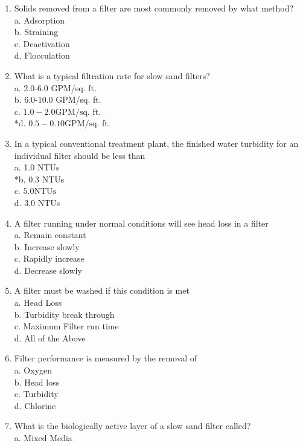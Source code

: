 \begin{enumerate}
\item Solids removed from a filter are most commonly removed by what method?\\
a. Adsorption\\
b. Straining\\
c. Deactivation\\
d. Flocculation\\
\item What is a typical filtration rate for slow sand filters?\\
a. 2.0-6.0 GPM/sq. ft.\\
b. 6.0-10.0 GPM/sq. ft.\\
c. $1.0-2.0 \mathrm{GPM} / \mathrm{sq}$. ft.\\
*d. $0.5-0.10 \mathrm{GPM} / \mathrm{sq}$. ft.\\
\item In a typical conventional treatment plant, the finished water turbidity for an individual filter should be less than\\
a. 1.0 NTUs\\
*b. 0.3 NTUs\\
c. $5.0 \mathrm{NTUs}$\\
d. 3.0 NTUs\\
\item A filter running under normal conditions will see head loss in a filter\\
a. Remain constant\\
b. Increase slowly\\
c. Rapidly increase\\
d. Decrease slowly\\
\item A filter must be washed if this condition is met\\
a. Head Loss\\
b. Turbidity break through\\
c. Maximum Filter run time\\
d. All of the Above\\
\item Filter performance is measured by the removal of\\
a. Oxygen\\
b. Head loss\\
c. Turbidity\\
d. Chlorine\\
\item What is the biologically active layer of a slow sand filter called?\\
a. Mixed Media\\

\end{enumerate}
